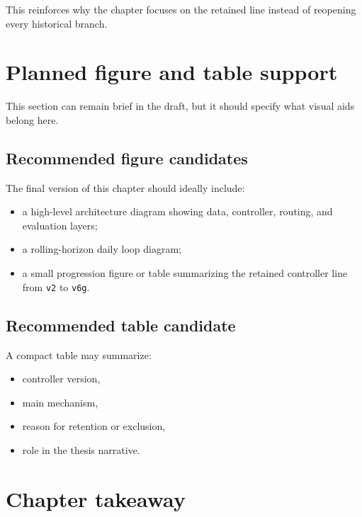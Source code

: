 This reinforces why the chapter focuses on the retained line instead of reopening every historical branch.

\section{Planned figure and table support}
\label{sec:arch_planned_figures}

This section can remain brief in the draft, but it should specify what visual aids belong here.

\subsection{Recommended figure candidates}
\label{subsec:arch_figure_candidates}

The final version of this chapter should ideally include:
\begin{itemize}
    \item a high-level architecture diagram showing data, controller, routing, and evaluation layers;
    \item a rolling-horizon daily loop diagram;
    \item a small progression figure or table summarizing the retained controller line from \texttt{v2} to \texttt{v6g}.
\end{itemize}

\subsection{Recommended table candidate}
\label{subsec:arch_table_candidate}

A compact table may summarize:
\begin{itemize}
    \item controller version,
    \item main mechanism,
    \item reason for retention or exclusion,
    \item role in the thesis narrative.
\end{itemize}

\section{Chapter takeaway}
\label{sec:arch_takeaway}


